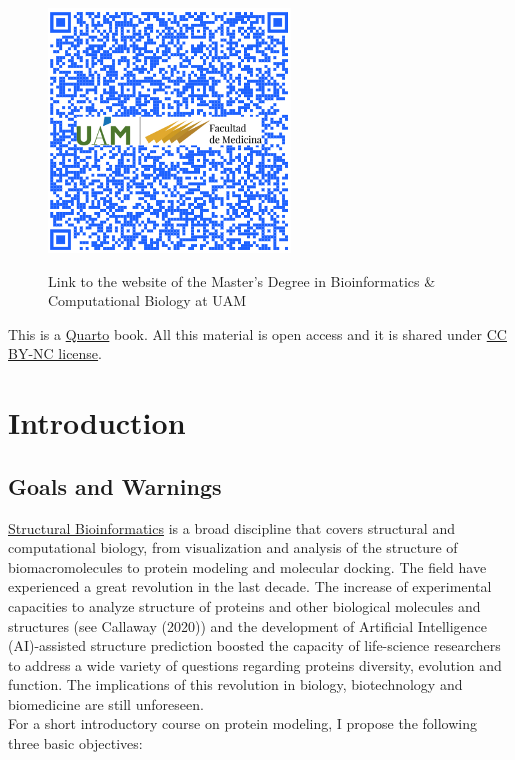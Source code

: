 \documentclass[
  letterpaper,
  DIV=11,
  numbers=noendperiod]{scrreprt}
\begin{document}
\begin{figure}

{\centering 

\href{https://www-uam-es.translate.goog/Medicina/MasterBioinformaticaBiologiaComputacional/1446820907497.htm?language=es\&nodepath=M?ster+Universitario+en+Bioinform?tica+y+Biolog?a+Computacional\&_x_tr_sl=es\&_x_tr_tl=en\&_x_tr_hl=es\&_x_tr_pto=wapp}{\includegraphics{./pics/QR_master.png}}

}

\caption{Link to the website of the Master's Degree in Bioinformatics \&
Computational Biology at UAM}

\end{figure}

This is a \href{https://quarto.org/docs/books}{Quarto} book. All this
material is open access and it is shared under
\href{https://creativecommons.org/licenses/by-nc/2.0/}{CC BY-NC
license}.

\hypertarget{introduction}{%
\chapter{Introduction}\label{introduction}}

\hypertarget{goals-and-warnings}{%
\section{Goals and Warnings}\label{goals-and-warnings}}

\href{https://en.wikipedia.org/wiki/Structural_bioinformatics}{Structural
Bioinformatics} is a broad discipline that covers structural and
computational biology, from visualization and analysis of the structure
of biomacromolecules to protein modeling and molecular docking. The
field have experienced a great revolution in the last decade. The
increase of experimental capacities to analyze structure of proteins and
other biological molecules and structures (see Callaway (2020)) and the
development of Artificial Intelligence (AI)-assisted structure
prediction boosted the capacity of life-science researchers to address a
wide variety of questions regarding proteins diversity, evolution and
function. The implications of this revolution in biology, biotechnology
and biomedicine are still unforeseen.\\
For a short introductory course on protein modeling, I propose the
following three basic objectives:
\end{document}

